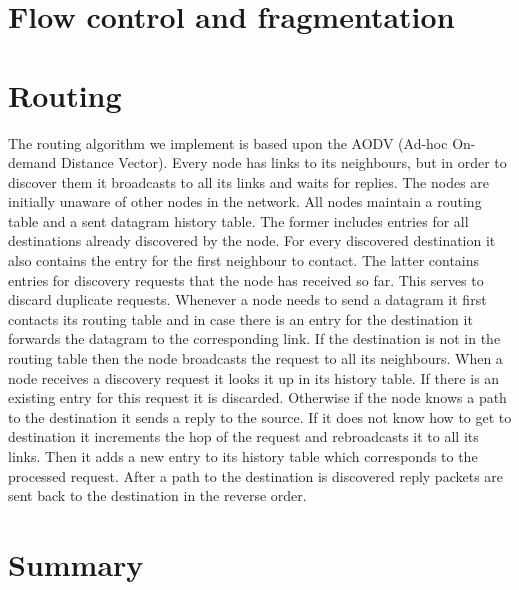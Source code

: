 \documentclass[11pt,a4paper,oneside]{report}
\begin{document}
\section*{Flow control and fragmentation}   

\section*{Routing}
  
The routing algorithm we implement is based upon the AODV (Ad-hoc On-demand
Distance Vector). Every node has links to its neighbours, but in order to
discover them it broadcasts to all its links and waits for replies. The nodes
are initially unaware of other nodes in the network. All nodes maintain a routing 
table and a sent datagram history table. The former includes entries for all
destinations already discovered by the node. For every discovered destination it also contains 
the entry for the first neighbour to contact. The latter contains entries 
for discovery requests that the node has received so far. This serves to 
discard duplicate requests. Whenever a node needs to send a datagram it first 
contacts its routing table and in case there is an entry for the destination
it forwards the datagram to the corresponding link. If the destination is not
in the routing table then the node broadcasts the request to all its
neighbours. When a node receives a discovery request it looks it up in its
history table. If there is an existing entry for this request it is discarded.
Otherwise if the node knows a path to the destination it sends a reply to the
source. If it does not know how to get to destination it increments the hop
of the request and rebroadcasts it to all its links. Then it adds a new entry to
its history table which corresponds to the processed request. After a path to
the destination is discovered reply packets are sent back to the destination
in the reverse order.
\section*{Summary}
\end{document}
